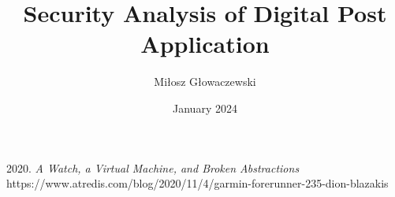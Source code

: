 \documentclass{article}
\title{Security Analysis of Digital Post Application}
\author{Miłosz Głowaczewski}
\date{January 2024}
\begin{document}
    \maketitle

    
    
    
    
    
    
    
    

    \begin{thebibliography}{99}
         2020. \textit{A Watch, a Virtual Machine, and Broken Abstractions} https://www.atredis.com/blog/2020/11/4/garmin-forerunner-235-dion-blazakis

%
    \end{thebibliography}
\end{document}
